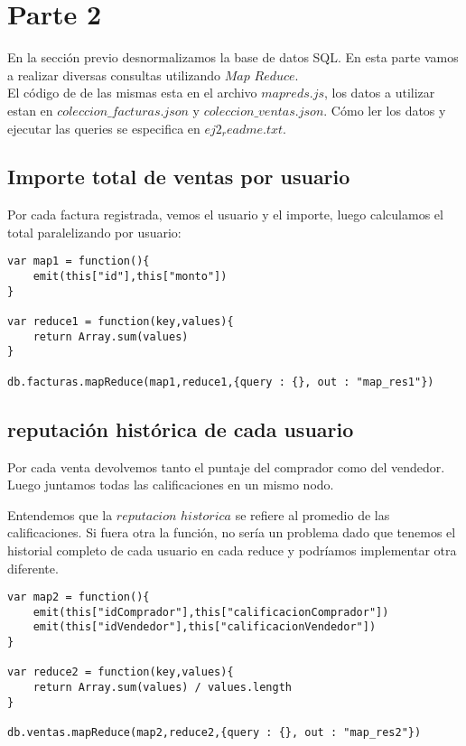 \section{Parte 2}

En la sección previo desnormalizamos la base de datos SQL. En esta parte vamos a realizar diversas consultas utilizando $Map$ $Reduce$. \\
El código de de las mismas esta en el archivo $mapreds.js$, los datos a utilizar estan en $coleccion\_facturas.json$ y $coleccion\_ventas.json$. Cómo ler los datos y ejecutar las queries se especifica en $ej2_readme.txt$.

\subsection{Importe total de ventas por usuario}

Por cada factura registrada, vemos el usuario y el importe, luego calculamos el total paralelizando por usuario: \\

\begin{verbatim}
var map1 = function(){
    emit(this["id"],this["monto"])
}

var reduce1 = function(key,values){
    return Array.sum(values)
}

db.facturas.mapReduce(map1,reduce1,{query : {}, out : "map_res1"})
\end{verbatim}

\subsection{reputación histórica de cada usuario}
Por cada venta devolvemos tanto el puntaje del comprador como del vendedor. Luego juntamos todas las calificaciones en un mismo nodo.


Entendemos que la $reputacion$ $historica$ se refiere al promedio de las calificaciones. Si fuera otra la función, no sería un problema dado que tenemos el historial completo de cada usuario en cada reduce y podríamos implementar otra diferente.

\begin{verbatim}
var map2 = function(){
    emit(this["idComprador"],this["calificacionComprador"])
    emit(this["idVendedor"],this["calificacionVendedor"])
}

var reduce2 = function(key,values){
    return Array.sum(values) / values.length
}

db.ventas.mapReduce(map2,reduce2,{query : {}, out : "map_res2"})
\end{verbatim}

